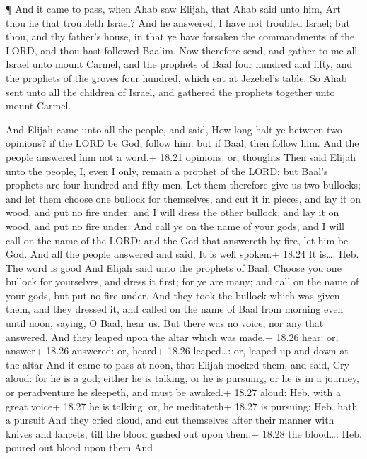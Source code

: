  ¶ And it came to pass, when Ahab saw Elijah, that Ahab
said unto him, Art thou he that troubleth Israel?  And he
answered, I have not troubled Israel; but thou, and thy father's house,
in that ye have forsaken the commandments of the LORD, and thou hast
followed Baalim.  Now therefore send, and gather to me all
Israel unto mount Carmel, and the prophets of Baal four hundred and
fifty, and the prophets of the groves four hundred, which eat at
Jezebel's table.  So Ahab sent unto all the children of
Israel, and gathered the prophets together unto mount Carmel.

 And Elijah came unto all the people, and said, How long
halt ye between two opinions? if the LORD be God, follow him: but if
Baal, then follow him. And the people answered him not a word.+ 18.21
opinions: or, thoughts  Then said Elijah unto the people,
I, even I only, remain a prophet of the LORD; but Baal's prophets are
four hundred and fifty men.  Let them therefore give us two
bullocks; and let them choose one bullock for themselves, and cut it in
pieces, and lay it on wood, and put no fire under: and I will dress the
other bullock, and lay it on wood, and put no fire under: 
And call ye on the name of your gods, and I will call on the name of the
LORD: and the God that answereth by fire, let him be God. And all the
people answered and said, It is well spoken.+ 18.24 It is\ldots: Heb.
The word is good  And Elijah said unto the prophets of
Baal, Choose you one bullock for yourselves, and dress it first; for ye
are many; and call on the name of your gods, but put no fire under.
 And they took the bullock which was given them, and they
dressed it, and called on the name of Baal from morning even until noon,
saying, O Baal, hear us. But there was no voice, nor any that answered.
And they leaped upon the altar which was made.+ 18.26 hear: or, answer+
18.26 answered: or, heard+ 18.26 leaped\ldots: or, leaped up and down at
the altar  And it came to pass at noon, that Elijah mocked
them, and said, Cry aloud: for he is a god; either he is talking, or he
is pursuing, or he is in a journey, or peradventure he sleepeth, and
must be awaked.+ 18.27 aloud: Heb. with a great voice+ 18.27 he is
talking: or, he meditateth+ 18.27 is pursuing: Heb. hath a pursuit
 And they cried aloud, and cut themselves after their
manner with knives and lancets, till the blood gushed out upon them.+
18.28 the blood\ldots: Heb. poured out blood upon them  And
